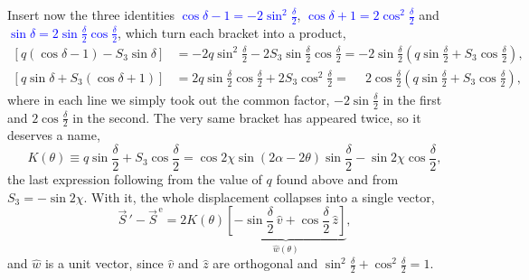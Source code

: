             Insert now the three identities \textcolor{blue}{$\cos\delta-1=-2\sin^2\frac{\delta}{2}$}, \textcolor{blue}{$\cos\delta+1=2\cos^2\frac{\delta}{2}$} and \textcolor{blue}{$\sin\delta=2\sin\frac{\delta}{2}\cos\frac{\delta}{2}$}, which turn each bracket into a product,
            \begin{align*}
                \left[q\left(\cos\delta-1\right)-S_3\sin\delta\right] &= -2q\sin^2\frac{\delta}{2}-2S_3\sin\frac{\delta}{2}\cos\frac{\delta}{2} = -2\sin\frac{\delta}{2}\left(q\sin\frac{\delta}{2}+S_3\cos\frac{\delta}{2}\right), \\
                \left[q\sin\delta+S_3\left(\cos\delta+1\right)\right] &= 2q\sin\frac{\delta}{2}\cos\frac{\delta}{2}+2S_3\cos^2\frac{\delta}{2} = \phantom{-}2\cos\frac{\delta}{2}\left(q\sin\frac{\delta}{2}+S_3\cos\frac{\delta}{2}\right),
            \end{align*}
            where in each line we simply took out the common factor, $-2\sin\frac\delta2$ in the first and $2\cos\frac\delta2$ in the second. The very same bracket has appeared twice, so it deserves a name,
            \begin{equation}\label{eq:KFactor}
                K(\theta) \equiv q\sin\frac{\delta}{2}+S_3\cos\frac{\delta}{2} = \cos2\chi\sin\left(2\alpha-2\theta\right)\sin\frac{\delta}{2}-\sin2\chi\cos\frac{\delta}{2},
            \end{equation}
            the last expression following from the value of $q$ found above and from $S_3=-\sin2\chi$. With it, the whole displacement collapses into a single vector,
            \begin{equation}\label{eq:ConeGeneratrix}
                \vec{S}\,'-\vec{S}^{\,\text{e}} = 2K(\theta)\underbrace{\left[-\sin\frac{\delta}{2}\,\hat{v}+\cos\frac{\delta}{2}\,\hat{z}\right]}_{\displaystyle \hat{w}(\theta)},
            \end{equation}
            and $\hat{w}$ is a unit vector, since $\hat{v}$ and $\hat{z}$ are orthogonal and $\sin^2\frac\delta2+\cos^2\frac\delta2=1$.

